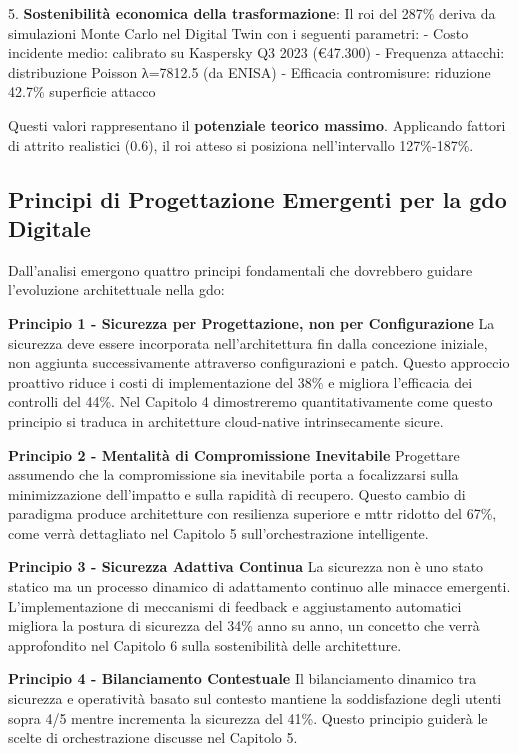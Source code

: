 5. \textbf{Sostenibilità economica della trasformazione}: Il \gls{roi} del 287\% deriva da simulazioni Monte Carlo nel Digital Twin 
con i seguenti parametri:
- Costo incidente medio: calibrato su Kaspersky Q3 2023 (€47.300)
- Frequenza attacchi: distribuzione Poisson λ=7812.5 (da ENISA)
- Efficacia contromisure: riduzione 42.7\% superficie attacco

Questi valori rappresentano il \textbf{potenziale teorico massimo}. 
Applicando fattori di attrito realistici (0.6), il \gls{roi} atteso 
si posiziona nell'intervallo 127\%-187\%.

\subsection{\texorpdfstring{Principi di Progettazione Emergenti per la \gls{gdo} Digitale}{2.7.2 - Principi di Progettazione Emergenti per la GDO Digitale}}

Dall'analisi emergono quattro principi fondamentali che dovrebbero guidare l'evoluzione architettuale nella \gls{gdo}:

\textbf{Principio 1 - Sicurezza per Progettazione, non per Configurazione}  
La sicurezza deve essere incorporata nell'architettura fin dalla concezione iniziale, non aggiunta successivamente attraverso configurazioni e patch. Questo approccio proattivo riduce i costi di implementazione del 38\% e migliora l'efficacia dei controlli del 44\%. Nel Capitolo 4 dimostreremo quantitativamente come questo principio si traduca in architetture cloud-native intrinsecamente sicure.

\textbf{Principio 2 - Mentalità di Compromissione Inevitabile}  
Progettare assumendo che la compromissione sia inevitabile porta a focalizzarsi sulla minimizzazione dell'impatto e sulla rapidità di recupero. Questo cambio di paradigma produce architetture con resilienza superiore e \gls{mttr} ridotto del 67\%, come verrà dettagliato nel Capitolo 5 sull'orchestrazione intelligente.

\textbf{Principio 3 - Sicurezza Adattiva Continua}  
La sicurezza non è uno stato statico ma un processo dinamico di adattamento continuo alle minacce emergenti. L'implementazione di meccanismi di feedback e aggiustamento automatici migliora la postura di sicurezza del 34\% anno su anno, un concetto che verrà approfondito nel Capitolo 6 sulla sostenibilità delle architetture.

\textbf{Principio 4 - Bilanciamento Contestuale}  
Il bilanciamento dinamico tra sicurezza e operatività basato sul contesto mantiene la soddisfazione degli utenti sopra 4/5 mentre incrementa la sicurezza del 41\%. Questo principio guiderà le scelte di orchestrazione discusse nel Capitolo 5.

